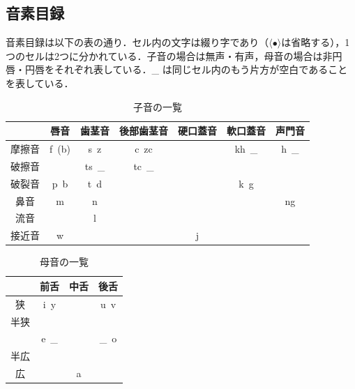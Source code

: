 \documentclass[../../main-detail.tex]{subfiles}
\begin{document}
\subsection{音素目録}
音素目録は以下の表の通り．セル内の文字は綴り字であり（$\langle\bullet\rangle$は省略する），1つのセルは2つに分かれている．子音の場合は無声・有声，母音の場合は非円唇・円唇をそれぞれ表している．\_ は同じセル内のもう片方が空白であることを表している．
\begin{table}[H]
  \caption{子音の一覧}
    \centering
    \begin{tabular}{ccccccc}
      \toprule
      & 唇音 & 歯茎音 & 後部歯茎音 & 硬口蓋音 & 軟口蓋音 & 声門音\\
      \midrule
      摩擦音 & f\ (b) & s\ z & c\ zc & & kh\ \_ & h\ \_\\
      破擦音 & & ts\ \_ & tc\ \_\\
      破裂音 & p\ b & t\ d & & & k\ g &\\
      鼻音 & m & n & & & & ng\\
      流音 & & l\\
      接近音 & w & & & j\\
      \bottomrule
    \end{tabular}
\end{table}
\begin{table}[H]
  \caption{母音の一覧}
    \centering
    \begin{tabular}{cccc}
      \toprule
      & 前舌 & 中舌 & 後舌\\
      \midrule
      狭 & i\ y & & u\ v\\
      半狭\\
      & e\ \_ & & \_\ o\\
      半広\\
      広 & & a & \\
      \bottomrule
    \end{tabular}
\end{table}
\end{document}
